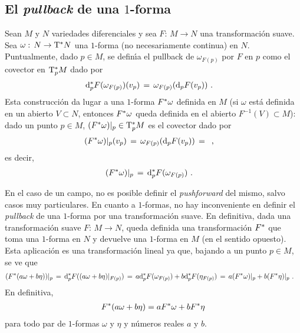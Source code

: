 \subsection{El \emph{pullback} de una $1$-forma}
Sean $M$ y $N$ variedades diferenciales y sea $F:\,M\rightarrow N$ una
transformaci\'{o}n suave. Sea $\omega:\,N\rightarrow\tangente*{N}$ una
$1$-forma (no necesariamente continua) en $N$. Puntualmente, dado $p\in M$,
se defin\'{\i}a el pullback de $\omega_{F(p)}$ por $F$ en $p$ como el
covector en $\tangente*[p]{M}$ dado por
\begin{align*}
	\diferencial*[p]{F}(\omega_{F(p)})(v_{p}) & \,=\,
		\omega_{F(p)}(\diferencial[p]{F}(v_{p}))
	\text{ .}
\end{align*}
%
Esta construcci\'{o}n da lugar a una $1$-forma ${F}^{*}\omega$ definida
en $M$ (si $\omega$ est\'{a} definida en un abierto $V\subset N$, entonces
${F}^{*}\omega$ queda definida en el abierto $F^{-1}(V)\subset M$):
dado un punto $p\in M$, $(\pull{F}\omega)|_{p}\in\tangente*[p]{M}$ es el
covector dado por
\begin{align*}
	(\pull{F}\omega)|_{p}(v_{p}) & \,=\,
		\omega_{F(p)}(\diferencial[p]{F}(v_{p})) \,=\,
	\text{ ,}
\end{align*}
%
es decir,
\begin{align*}
	(\pull{F}\omega)|_{p} & \,=\,\diferencial*[p]{F}(\omega_{F(p)})
	\text{ .}
\end{align*}
%

En el caso de un campo, no es posible definir el \emph{pushforward} del mismo,
salvo casos muy particulares. En cuanto a $1$-formas, no hay inconveniente
en definir el \emph{pullback} de una $1$-forma por una transformaci\'{o}n
suave. En definitiva, dada una transformaci\'{o}n suave
$F:\,M\rightarrow N$, queda definida una transformaci\'{o}n
${F}^{*}$ que toma una $1$-forma en $N$ y devuelve una $1$-forma en $M$
(en el sentido opuesto). Esta aplicaci\'{o}n es una transformaci\'{o}n lineal
ya que, bajando a un punto $p\in M$, se ve que
\begin{align*}
	(\pull{F}(a\omega+b\eta))|_{p} & \,=\,
		\diferencial*[p]{F}((a\omega+b\eta)|_{F(p)}) \,=\,
		a\diferencial*[p]{F}(\omega_{F(p)}) +
			b\diferencial*[p]{F}(\eta_{F(p)}) \,=\,
		a(\pull{F}\omega)|_{p} +b(\pull{F}\eta)|_{p}
	\text{ .}
\end{align*}
%
En definitiva,
\begin{align*}
	{F}^{*}(a\omega+b\eta)=a{F}^{*}\omega+b{F}^{*}\eta
\end{align*}
%
para todo par de $1$-formas $\omega$ y $\eta$ y n\'{u}meros reales
$a$ y $b$.

